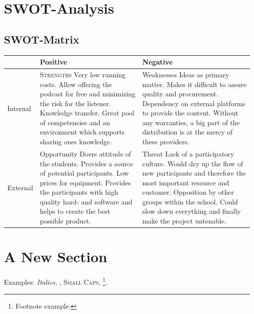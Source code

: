\section{SWOT-Analysis}
\subsection{SWOT-Matrix}

\begin{tabu}{|l|X[1]|X[1]|}

\hline
 			& Positive & Negative \\ \hline
 Internal	&
 			\textsc{Strengths}
Very low running costs. Allow offering the podcast for free and minimizing the risk for the listener.
Knowledge transfer. Great pool of competencies and an environment which supports sharing ones knowledge.
			&
			Weaknesses
Ideas as primary matter. Makes it difficult to assure quality and procurement.
Dependency on external platforms to provide the content. Without
any warranties, a big part of the distribution is at the mercy of these providers. \\
\hline

External 	&
			Opportunity
Doers attitude of the students.
Provides a source of potential participants.
Low prices for equipment. Provides the participants with high quality hard- and software and helps to create the best possible product.
			&
			Threat \citeauthor{bentley:1999}
Lack of a participatory culture. Would dry up the flow of new participants and therefore the most important resource and customer.
Opposition by other groups within the school. Could slow down everything and finally make the project untenable. \\
\hline

\end{tabu}



\lipsum[1]


\section{A New Section}

\lipsum[2]

Examples: \textit{Italics}, , \textsc{Small Caps}, \footnote{Footnote example.}.



